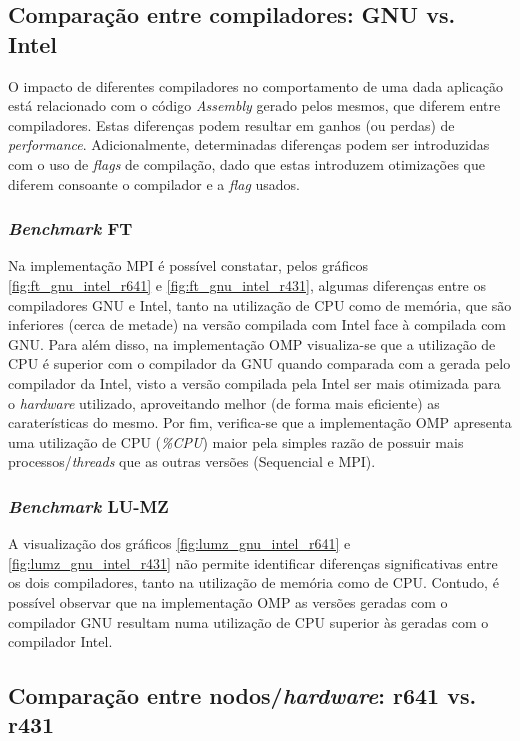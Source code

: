 \documentclass{article}
\begin{document}
\subsection{Comparação entre compiladores: GNU vs. Intel}

\quad O impacto de diferentes compiladores no comportamento de uma dada aplicação está relacionado com o código \textit{Assembly} gerado
pelos mesmos, que diferem entre compiladores. Estas diferenças podem resultar em ganhos (ou perdas) de \textit{performance}. Adicionalmente,
determinadas diferenças podem ser introduzidas com o uso de \textit{flags} de compilação, dado que estas introduzem otimizações  que diferem
consoante o compilador e a \textit{flag} usados. 


\subsubsection{\textit{Benchmark} FT}

\quad Na implementação MPI é possível constatar, pelos gráficos \ref{fig:ft_gnu_intel_r641} e \ref{fig:ft_gnu_intel_r431}, algumas diferenças entre 
os compiladores GNU e Intel, tanto na utilização de CPU como de memória, que são inferiores (cerca de metade) na versão compilada com Intel face à 
compilada com GNU. Para além disso, na implementação OMP visualiza-se que a utilização de CPU é superior com o compilador da GNU quando comparada com
a gerada pelo compilador da Intel, visto a versão compilada pela Intel ser mais otimizada para o \textit{hardware} utilizado, aproveitando melhor (de forma mais eficiente) as caraterísticas
do mesmo. Por fim, verifica-se que a implementação OMP apresenta uma utilização de CPU (\textit{\%CPU}) maior pela simples razão de possuir mais 
processos/\textit{threads} que as outras versões (Sequencial e MPI). 


\subsubsection{\textit{Benchmark} LU-MZ}

\quad A visualização dos gráficos \ref{fig:lumz_gnu_intel_r641} e \ref{fig:lumz_gnu_intel_r431} não permite identificar diferenças significativas entre
os dois compiladores, tanto na utilização de memória como de CPU. Contudo, é possível observar que na implementação OMP as versões geradas com o 
compilador GNU resultam numa utilização de CPU superior às geradas com o compilador Intel. 


\subsection{Comparação entre nodos/\textit{hardware}: r641 vs. r431}
\end{document}
